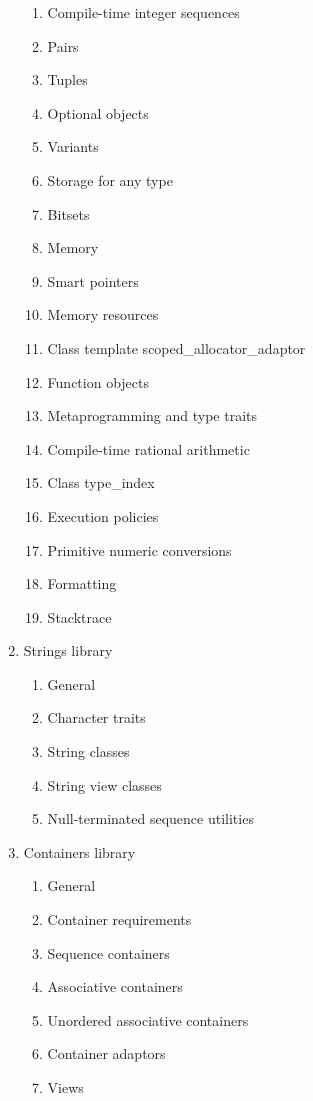 \begin{enumerate}
\begin{enumerate}[label=\arabic{enumi}.\arabic*.]
      \item Compile-time integer sequences 
      \item Pairs 
      \item Tuples 
      \item Optional objects  
      \item Variants 
      \item Storage for any type 
      \item Bitsets 
      \item Memory 
      \item Smart pointers 
      \item Memory resources 
      \item Class template scoped\_allocator\_adaptor
      \item Function objects
      \item Metaprogramming and type traits 
      \item Compile-time rational arithmetic 
      \item Class type\_index 
      \item Execution policies 
      \item Primitive numeric conversions 
      \item Formatting 
      \item Stacktrace
     \end{enumerate}
\item Strings library
    \begin{enumerate}[label=\arabic{enumi}.\arabic*.]
      \item General 
      \item Character traits 
      \item String classes
      \item String view classes
      \item Null-terminated sequence utilities
     \end{enumerate}
\item Containers library
    \begin{enumerate}[label=\arabic{enumi}.\arabic*.]
      \item General 
      \item Container requirements
      \item Sequence containers 
      \item Associative containers 
      \item Unordered associative containers
      \item Container adaptors 
      \item Views

\end{enumerate}
\end{enumerate}
